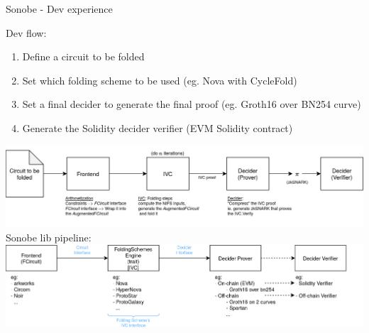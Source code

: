 \documentclass[t]{beamer} \usefonttheme[onlymath]{serif}
\begin{document}
\begin{frame}{Sonobe - Dev experience}
  \scriptsize{

  Dev flow:
  \begin{enumerate}
    \item Define a circuit to be folded
    \item Set which folding scheme to be used (eg. Nova with CycleFold)
    \item Set a final decider to generate the final proof (eg. Groth16 over BN254 curve)
    \item Generate the Solidity decider verifier (EVM Solidity contract)
  \end{enumerate}
  }

  \includegraphics[width=\textwidth]{folding-scheme-pipeline-without-augmentedfcircuit}
  Sonobe lib pipeline:
  \includegraphics[width=\textwidth]{sonobe-lib-pipeline}
\end{frame}
\end{document}
